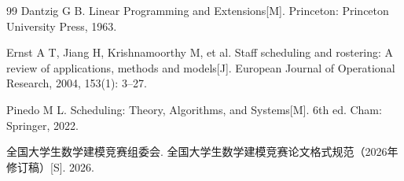 \begin{thebibliography}{99}
Dantzig G B. \newblock Linear Programming and Extensions[M]. \newblock Princeton: Princeton University Press, 1963.

Ernst A T, Jiang H, Krishnamoorthy M, et al. \newblock Staff scheduling and rostering: A review of applications, methods and models[J]. \newblock European Journal of Operational Research, 2004, 153(1): 3--27.

Pinedo M L. \newblock Scheduling: Theory, Algorithms, and Systems[M]. 6th ed. \newblock Cham: Springer, 2022.

全国大学生数学建模竞赛组委会. \newblock 全国大学生数学建模竞赛论文格式规范（2026年修订稿）[S]. 2026.
\end{thebibliography}

